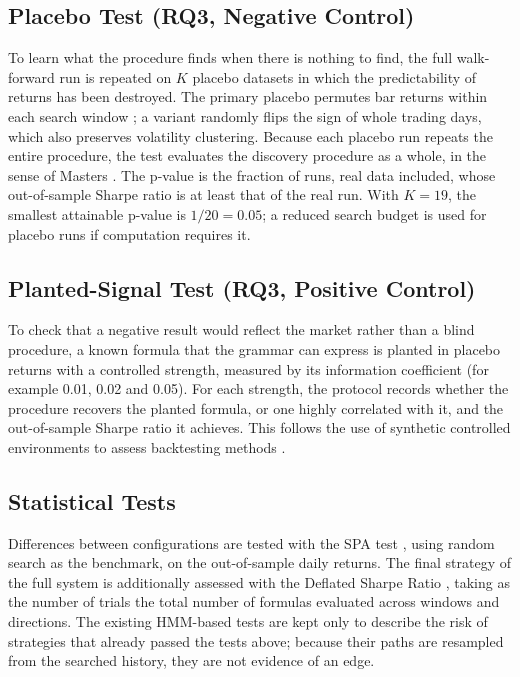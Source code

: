 \documentclass[12pt,a4paper,oneside]{book}
\theoremstyle{definition}
\begin{document}
\subsection{Placebo Test (RQ3, Negative Control)}

To learn what the procedure finds when there is nothing to find, the full walk-forward run is repeated on $K$ placebo datasets in which the predictability of returns has been destroyed. The primary placebo permutes bar returns within each search window \cite{aronson2006,masters2020}; a variant randomly flips the sign of whole trading days, which also preserves volatility clustering. Because each placebo run repeats the entire procedure, the test evaluates the discovery procedure as a whole, in the sense of Masters \cite{masters2020}. The p-value is the fraction of runs, real data included, whose out-of-sample Sharpe ratio is at least that of the real run. With $K = 19$, the smallest attainable p-value is $1/20 = 0.05$; a reduced search budget is used for placebo runs if computation requires it.

\subsection{Planted-Signal Test (RQ3, Positive Control)}

To check that a negative result would reflect the market rather than a blind procedure, a known formula that the grammar can express is planted in placebo returns with a controlled strength, measured by its information coefficient (for example 0.01, 0.02 and 0.05). For each strength, the protocol records whether the procedure recovers the planted formula, or one highly correlated with it, and the out-of-sample Sharpe ratio it achieves. This follows the use of synthetic controlled environments to assess backtesting methods \cite{lopezdeprado2018,arian2024}.

\subsection{Statistical Tests}

Differences between configurations are tested with the SPA test \cite{hansen2005}, using random search as the benchmark, on the out-of-sample daily returns. The final strategy of the full system is additionally assessed with the Deflated Sharpe Ratio \cite{bailey2014}, taking as the number of trials the total number of formulas evaluated across windows and directions. The existing HMM-based tests are kept only to describe the risk of strategies that already passed the tests above; because their paths are resampled from the searched history, they are not evidence of an edge.
\end{document}
